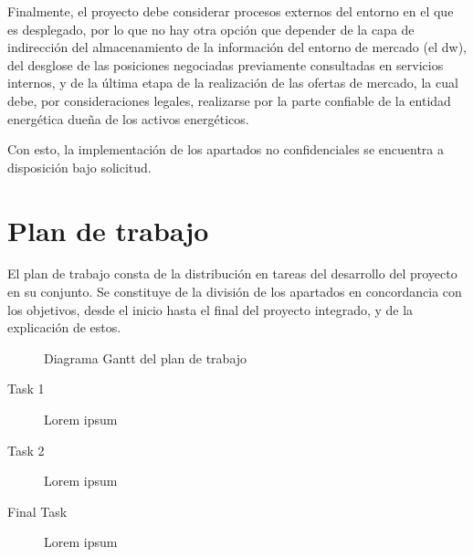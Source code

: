 Finalmente, el proyecto debe considerar procesos externos del entorno en el que es desplegado, por lo que no hay otra opción que depender de la capa de indirección del almacenamiento de la información del entorno de mercado (el \gls{dw}), del desglose de las posiciones negociadas previamente consultadas en servicios internos, y de la última etapa de la realización de las ofertas de mercado, la cual debe, por consideraciones legales, realizarse por la parte confiable de la entidad energética dueña de los activos energéticos.

Con esto, la implementación de los apartados no confidenciales se encuentra a disposición bajo solicitud.

\section{Plan de trabajo}
\label{makereference1.3}

El plan de trabajo consta de la distribución en tareas del desarrollo del proyecto en su conjunto. Se constituye de la división de los apartados en concordancia con los objetivos, desde el inicio hasta el final del proyecto integrado, y de la explicación de estos.

\begin{figure}[h]
  \centering
  \caption{Diagrama Gantt del plan de trabajo}
  \label{fig:plan-trabajo}
\end{figure}

\begin{description}

  \item[Task 1] Lorem ipsum

  \item[Task 2] Lorem ipsum

  \item[Final Task] Lorem ipsum

\end{description}
